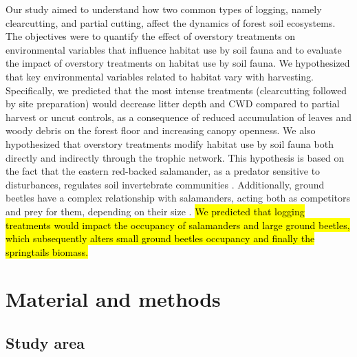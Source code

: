 Our study aimed to understand how two common types of logging, namely clearcutting, and partial cutting, affect the dynamics of forest soil ecosystems. 
The objectives were to quantify the effect of overstory treatments on environmental variables that influence habitat use by soil fauna 
and to evaluate the impact of overstory treatments on habitat use by soil fauna. 
We hypothesized that key environmental variables related to habitat vary with harvesting. 
Specifically, we predicted that the most intense treatments (clearcutting followed by site preparation) would decrease litter depth and CWD compared to partial harvest or uncut controls, 
as a consequence of reduced accumulation of leaves and woody debris on the forest floor and increasing canopy openness. 
We also hypothesized that overstory treatments modify habitat use by soil fauna both directly and indirectly through the trophic network. 
This hypothesis is based on the fact that the eastern red-backed salamander, as a predator sensitive to disturbances, regulates soil invertebrate communities \citep{Wyman1998Experimentalassessment,MichaelWalton2005Salamandersforestfloor,Walton2006Salamandersforestfloor,Walton2013Topdownregulation,Hickerson2017Easternredbacked}. 
Additionally, ground beetles have a complex relationship with salamanders, acting both as competitors and prey for them, depending on their size \citep{Jaeger1980MicrohabitatsTerrestrial,loveiEcologyBehaviorGround1996,Gall2003BehavioralInteractions}. 
\hl{We predicted that logging treatments would impact the occupancy of salamanders and large ground beetles, which subsequently alters small ground beetles occupancy and finally the springtails biomass. }


\section*{Material and methods}
\label{sec:matmet1}

\subsection*{Study area}
\label{subsec:area}


